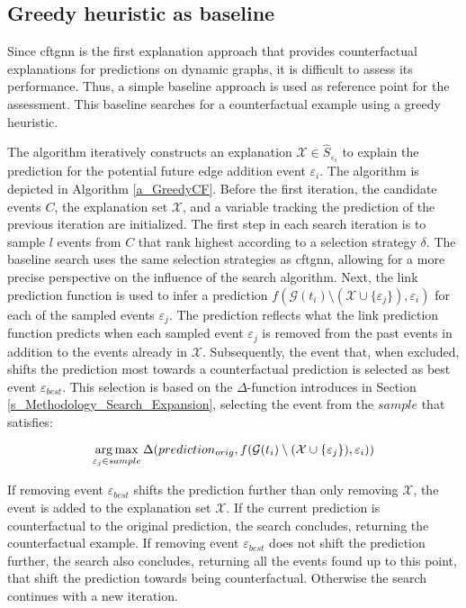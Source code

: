 \subsection{Greedy heuristic as baseline}
\label{s_Methodology_GreedyBaseline}

Since \gls{cftgnn} is the first explanation approach that provides counterfactual explanations for predictions on dynamic graphs, it is difficult to assess its performance. Thus, a simple baseline approach is used as reference point for the assessment. This baseline searches for a counterfactual example using a greedy heuristic. 

The algorithm iteratively constructs an explanation $\mathcal{X} \in \hat{S}_{\varepsilon_i}$ to explain the prediction for the potential future edge addition event $\varepsilon_i$. The algorithm is depicted in Algorithm \ref{a_GreedyCF}. Before the first iteration, the candidate events $C$, the explanation set $\mathcal{X}$, and a variable tracking the prediction of the previous iteration are initialized. The first step in each search iteration is to sample $l$ events from $C$ that rank highest according to a selection strategy $\delta$. The baseline search uses the same selection strategies as \gls{cftgnn}, allowing for a more precise perspective on the influence of the search algorithm. Next, the link prediction function is used to infer a prediction $f(\mathcal{G}(t_i) \setminus (\mathcal{X} \cup \{\varepsilon_j\}), \varepsilon_i)$ for each of the sampled events $\varepsilon_j$. The prediction reflects what the link prediction function predicts when each sampled event $\varepsilon_j$ is removed from the past events in addition to the events already in $\mathcal{X}$. Subsequently, the event that, when excluded, shifts the prediction most towards a counterfactual prediction is selected as best event $\varepsilon_{best}$. This selection is based on the $\Delta$-function introduces in Section \ref{s_Methodology_Search_Expansion}, selecting the event from the $sample$ that satisfies:

\begin{equation}
    \operatorname*{arg\,max}_{\varepsilon_j \in sample} \Delta(prediction_{orig}, f(\mathcal{G}(t_i) \setminus (\mathcal{X} \cup \{\varepsilon_j\}), \varepsilon_i))
\end{equation}

If removing event $\varepsilon_{best}$ shifts the prediction further than only removing $\mathcal{X}$, the event is added to the explanation set $\mathcal{X}$. If the current prediction is counterfactual to the original prediction, the search concludes, returning the counterfactual example. If removing event $\varepsilon_{best}$ does not shift the prediction further, the search also concludes, returning all the events found up to this point, that shift the prediction towards being counterfactual. Otherwise the search continues with a new iteration.

